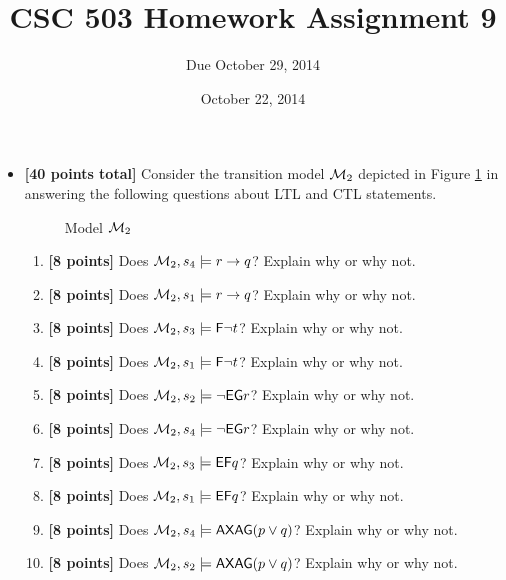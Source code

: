 \documentclass{article}
\title{CSC 503 Homework Assignment 9}
\author{Due October 29, 2014}
\date{October 22, 2014}
\def\Sometime{\mathord{\mathsf{F}}}
\def\Forever{\mathord{\mathsf{G}}}
\def\NextX{\mathord{\mathsf{X}}}
\def\All{\mathord{\mathsf{A}}}
\def\Exists{\mathord{\mathsf{E}}}
\begin{document}
\maketitle

\begin{itemize}
\item \textbf{[40 points total]} Consider the transition model ${\cal
    M}_2$ depicted in Figure \ref{f2} in answering the following
  questions about LTL and CTL statements.
  \begin{figure}[h]
    \centering
    \caption{Model ${\cal M}_2$}
\begin{center}

\end{center}
\label{f2}
\end{figure}
  \begin{enumerate}
  \item \textbf{[8 points]} Does ${\cal M}_2, s_4 \models r \implies
    q$?  Explain why or why not.
  \item \textbf{[8 points]} Does ${\cal M}_2, s_1 \models r \implies
    q$?  Explain why or why not.
  \item \textbf{[8 points]} Does ${\cal M}_2, s_3 \models \Sometime
    \neg t$?  Explain why or why not.
  \item \textbf{[8 points]} Does ${\cal M}_2, s_1 \models \Sometime
    \neg t$?  Explain why or why not.
  \item \textbf{[8 points]} Does ${\cal M}_2, s_2 \models \neg \Exists
    \Forever r$?  Explain why or why not.
  \item \textbf{[8 points]} Does ${\cal M}_2, s_4 \models \neg \Exists
    \Forever r$?  Explain why or why not.
  \item \textbf{[8 points]} Does ${\cal M}_2, s_3 \models \Exists
    \Sometime q$?  Explain why or why not.
  \item \textbf{[8 points]} Does ${\cal M}_2, s_1 \models \Exists
    \Sometime q$?  Explain why or why not.
  \item \textbf{[8 points]} Does ${\cal M}_2, s_4 \models \All
    \NextX \All \Forever (p \lor q)$?  Explain why or why not.
  \item \textbf{[8 points]} Does ${\cal M}_2, s_2 \models \All \NextX
    \All \Forever (p \lor q)$?  Explain why or why not.
  \end{enumerate}


\end{itemize}
\end{document}
